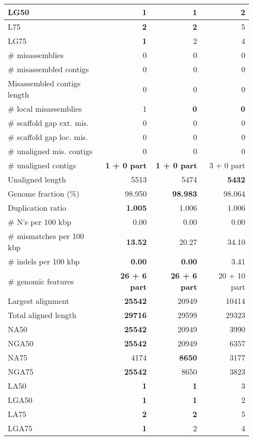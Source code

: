 \documentclass[12pt,a4paper]{article}
\begin{document}
\begin{table}[ht]
\begin{center}
\begin{tabular}{|l*{3}{|r}|}
LG50 & {\bf 1} & {\bf 1} & 2 \\ \hline
L75 & {\bf 2} & {\bf 2} & 5 \\ \hline
LG75 & {\bf 1} & 2 & 4 \\ \hline
\# misassemblies & 0 & 0 & 0 \\ \hline
\# misassembled contigs & 0 & 0 & 0 \\ \hline
Misassembled contigs length & 0 & 0 & 0 \\ \hline
\# local misassemblies & 1 & {\bf 0} & {\bf 0} \\ \hline
\# scaffold gap ext. mis. & 0 & 0 & 0 \\ \hline
\# scaffold gap loc. mis. & 0 & 0 & 0 \\ \hline
\# unaligned mis. contigs & 0 & 0 & 0 \\ \hline
\# unaligned contigs & {\bf 1 + 0 part} & {\bf 1 + 0 part} & 3 + 0 part \\ \hline
Unaligned length & 5513 & 5474 & {\bf 5432} \\ \hline
Genome fraction (\%) & 98.950 & {\bf 98.983} & 98.064 \\ \hline
Duplication ratio & {\bf 1.005} & 1.006 & 1.006 \\ \hline
\# N's per 100 kbp & 0.00 & 0.00 & 0.00 \\ \hline
\# mismatches per 100 kbp & {\bf 13.52} & 20.27 & 34.10 \\ \hline
\# indels per 100 kbp & {\bf 0.00} & {\bf 0.00} & 3.41 \\ \hline
\# genomic features & {\bf 26 + 6 part} & {\bf 26 + 6 part} & 20 + 10 part \\ \hline
Largest alignment & {\bf 25542} & 20949 & 10414 \\ \hline
Total aligned length & {\bf 29716} & 29599 & 29323 \\ \hline
NA50 & {\bf 25542} & 20949 & 3990 \\ \hline
NGA50 & {\bf 25542} & 20949 & 6357 \\ \hline
NA75 & 4174 & {\bf 8650} & 3177 \\ \hline
NGA75 & {\bf 25542} & 8650 & 3823 \\ \hline
LA50 & {\bf 1} & {\bf 1} & 3 \\ \hline
LGA50 & {\bf 1} & {\bf 1} & 2 \\ \hline
LA75 & {\bf 2} & {\bf 2} & 5 \\ \hline
LGA75 & {\bf 1} & 2 & 4 \\ \hline
\end{tabular}
\end{center}
\end{table}
\end{document}
